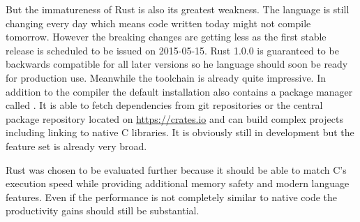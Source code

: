 But the immatureness of Rust is also its greatest weakness. The language is still changing every day which means code written today might not compile tomorrow. However the breaking changes are getting less as the first stable release is scheduled to be issued on 2015-05-15. Rust 1.0.0 is guaranteed to be backwards compatible for all later versions so he language should soon be ready for production use. Meanwhile the toolchain is already quite impressive. In addition to the compiler the default installation also contains a package manager called . It is able to fetch dependencies from git repositories or the central package repository located on \url{https://crates.io} and can build complex projects including linking to native C libraries. It is obviously still in development but the feature set is already very broad.

Rust was chosen to be evaluated further because it should be able to match C's execution speed while providing additional memory safety and modern language features. Even if the performance is not completely similar to native code the productivity gains should still be substantial.
